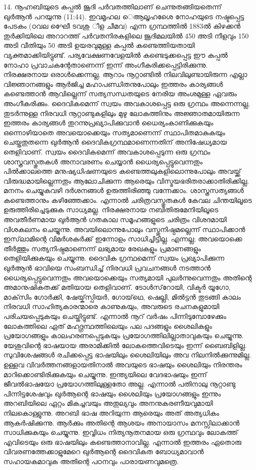 14. നൂഹ്നബിയുടെ കപ്പല്‍ ജൂദി പര്‍വതത്തിലാണ് ചെന്നുതങ്ങിയതെന്ന് ഖുര്‍ആന്‍ പറയുന്നു (11:44). ഇവമൃഹല െആലൃഹശെേ നോഹയുടെ നഷ്ടപ്പെട്ട പേടകം (ഠവല ഘീേെ ടവശു ീള ചീമവ) എന്ന ഗ്രന്ഥത്തില്‍ 1883ല്‍ കിഴക്കന്‍ തുര്‍ക്കിയിലെ അറാറത്ത് പര്‍വതനിരകളിലെ ജൂദിമലയില്‍ 450 അടി നീളവും 150 അടി വീതിയും 50 അടി ഉയരവുമുള്ള കപ്പല്‍ കണ്ടെത്തിയതായി വ്യക്തമാക്കിയിട്ടുണ്ട്. പര്യവേക്ഷണവേളയില്‍ കണ്ടെടുക്കപ്പെട്ട ഈ കപ്പല്‍ നോഹാ പ്രവാചകന്റേതാണെന്ന് ഇന്ന് അംഗീകരിക്കപ്പെട്ടിരിക്കുന്നു.
നിരക്ഷരനായ ഒരാള്‍ക്കെന്നല്ല, ആറാം നൂറ്റാണ്ടില്‍ നിലവിലുണ്ടായിരുന്ന എല്ലാ വിജ്ഞാനങ്ങളും ആര്‍ജിച്ച മഹാപണ്ഡിതനുപോലും ഇത്തരം കാര്യങ്ങള്‍ കണ്ടെത്താന്‍ ആവില്ലെന്ന് സത്യസന്ധതയുടെ നേരിയ അംശമുള്ള ഏവരും അംഗീകരിക്കും. ദൈവികമെന്ന് സ്വയം അവകാശപ്പെട്ട ഒരു ഗ്രന്ഥം അന്നെന്നല്ല, തുടര്‍ന്നുള്ള നിരവധി നൂറ്റാണ്ടുകളിലും മുഴു ലോകത്തിനും അജ്ഞാതമായിരുന്ന ഇത്തരം കാര്യങ്ങള്‍ തുറന്നുപ്രഖ്യാപിക്കുവാന്‍ ധൈര്യംകാണിക്കുകയും ഒന്നൊഴിയാതെ അവയൊക്കെയും സത്യമാണെന്ന് സ്ഥാപിതമാകുകയും ചെയ്തതുതന്നെ ഖുര്‍ആന്‍ ദൈവികഗ്രന്ഥമാണെന്നതിന് അനിഷേധ്യമായ തെളിവാണ്. സ്വയം ദൈവികമെന്ന് അവകാശപ്പെടുന്ന ഒരു ഗ്രന്ഥം ശാസ്ത്രവസ്തുതകള്‍ അനാവരണം ചെയ്യാന്‍ ധൈര്യപ്പെട്ടുവെന്നതും പില്‍ക്കാലത്തെ മനുഷ്യധിഷണയുടെ കണ്ടെത്തലുകളിലൊന്നുപോലും അവയ്ക്ക് വിരുദ്ധമായില്ലെന്നതും ആലോചിക്കുന്ന ആരെയും വിസ്മയഭരിതരാക്കാതിരിക്കില്ല.
മനനം ചെയ്യുകവഴി ദര്‍ശനങ്ങള്‍ ഉരുത്തിരിഞ്ഞു വന്നേക്കാം. ശാസ്ത്രസത്യങ്ങള്‍ കണ്ടെത്താനും കഴിഞ്ഞേക്കാം. എന്നാല്‍ ചരിത്രവസ്തുതകള്‍ കേവല ചിന്തയിലൂടെ ഉരുത്തിരിച്ചെടുക്കുക സാധ്യമല്ല. നിരക്ഷരനായ നബിതിരുമേനിയിലൂടെ അവതീര്‍ണമായ ഖുര്‍ആന്‍ ഗതകാല സമൂഹങ്ങളുടെ ചരിത്രം വിശദമായി വിശകലനം ചെയ്യുന്നു. അവയിലൊന്നുപോലും വസ്തുനിഷ്ഠമല്ലെന്ന് സ്ഥാപിക്കാന്‍ ഇസ്‌ലാമിന്റെ വിമര്‍ശകര്‍ക്ക് ഇന്നോളം സാധിച്ചിട്ടില്ല. എന്നല്ല; അവയൊക്കെ തീര്‍ത്തും സത്യനിഷ്ഠമാണെന്ന് ലഭ്യമായ രേഖകളും പ്രമാണങ്ങളും തെളിയിക്കുകയും ചെയ്യുന്നു.
ദൈവിക ഗ്രന്ഥമെന്ന് സ്വയം പ്രഖ്യാപിക്കുന്ന ഖുര്‍ആന്‍ ഭാവിയെ സംബന്ധിച്ച് നിരവധി പ്രവചനങ്ങള്‍ നടത്താന്‍ ധൈര്യപ്പെട്ടുവെന്നതും അവയൊക്കെയും സത്യമായി പുലര്‍ന്നുവെന്നതും അതിന്റെ അമാനുഷികതക്ക് മതിയായ തെളിവാണ്.
ടോള്‍സ്‌റോയി, വിക്ടര്‍ യൂഗോ, മാക്‌സിം ഗോര്‍ക്കി, ഷേയ്ക്‌സ്പിയര്‍, ഗോയ്‌ഥെ, ഷെല്ലി, മില്‍ട്ടന്‍ തുടങ്ങി കാലം നിരവധി സാഹിത്യകാരന്മാരെ കാണുകയും, അവരുടെ രചനകളുമായി പരിചയപ്പെടുകയും ചെയ്തിട്ടുണ്ട്. എന്നാല്‍ നൂറ് വര്‍ഷം പിന്നിടുമ്പോഴേക്കും ലോകത്തിലെ ഏത് മഹദ്ഗ്രന്ഥത്തിലെയും പല പദങ്ങളും ശൈലികളും പ്രയോഗങ്ങളും കാലഹരണപ്പെടുകയും പ്രയോഗത്തിലില്ലാതാവുകയും ചെയ്യുന്നു.
യേശുവിന്റെ ഭാഷയായ അരാമിക്കില്‍ ലോകത്തെവിടെയും ഇന്ന് ബൈബിളില്ല. സുവിശേഷങ്ങള്‍ രചിക്കപ്പെട്ട ഭാഷയിലും ശൈലിയിലും അവ നിലനില്‍ക്കുന്നുമില്ല. ഉള്ളവ വിവര്‍ത്തനങ്ങളായതിനാല്‍ അവയുടെ ഭാഷയും ശൈലിയും നിരന്തരം മാറിക്കൊണ്ടിരിക്കുകയും ചെയ്യുന്നു. ഇന്ത്യയിലെ വേദഭാഷയും ഇന്ന് ജീവല്‍ഭാഷയോ പ്രയോഗത്തിലുള്ളതോ അല്ല.
എന്നാല്‍ പതിനാലു നൂറ്റാണ്ടു പിന്നിട്ടശേഷവും ഖുര്‍ആന്റെ ഭാഷയും ശൈലിയും പ്രയോഗങ്ങളും ഇന്നും അറബിയിലെ ഏറ്റം മികച്ചവയും അതുല്യവും അനനുകരണീയവുമായി നിലകൊള്ളുന്നു. അറബി ഭാഷ അറിയുന്ന ആരെയും അത് അത്യധികം ആകര്‍ഷിക്കുന്നു. ആര്‍ക്കും അതിന്റെ ആശയം അനായാസം മനസ്സിലാക്കാന്‍ സാധിക്കുകയും ചെയ്യുന്നു. ഇവ്വിധം നിത്യനൂതനമായ ഒരു ഗ്രന്ഥവും ലോകത്ത് എവിടെയും ഒരു ഭാഷയിലും കണ്ടെത്താനാവില്ല.
എന്നാല്‍ ഇത്തരം ഏതൊരു വിവരണത്തേക്കാളുമേറെ ഖുര്‍ആന്റെ ദൈവികത ബോധ്യമാവാന്‍ സഹായകമാവുക അതിന്റെ പഠനവും പാരായണവുമത്രെ.

